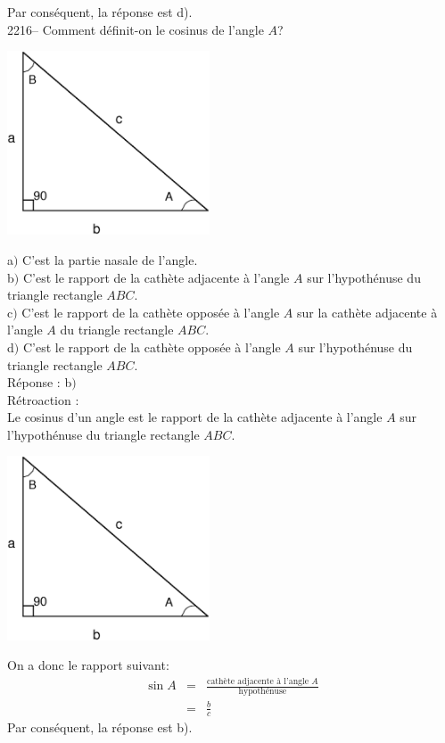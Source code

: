 \documentclass[letterpaper, 12pt]{article}
\begin{document}
Par cons\'equent, la r\'eponse est d).\\

2216-- Comment d\'efinit-on le cosinus de l'angle $A$? \\
\begin{center}
 \includegraphics[width=6cm,bb=14 14 591 533]{Triangle_rectangle2.eps}
\end{center}
a$)$ C'est la partie nasale de l'angle.\\
b$)$ C'est le rapport de la cath\`ete adjacente \`a l'angle $A$ sur l'hypoth\'enuse du triangle rectangle $ABC$.\\
c$)$ C'est le rapport de la cath\`ete oppos\'ee \`a l'angle $A$ sur la cath\`ete adjacente \`a l'angle $A$ du triangle rectangle $ABC$.\\
d$)$ C'est le rapport de la cath\`ete oppos\'ee \`a l'angle $A$ sur l'hypoth\'enuse du triangle rectangle $ABC$.\\

R\'eponse : b$)$\\

R\'etroaction :\\
Le cosinus d'un angle est le rapport de la cath\`ete adjacente \`a l'angle $A$ sur l'hypoth\'enuse du triangle rectangle $ABC$.\\
\begin{center}
 \includegraphics[width=6cm,bb=14 14 591 533]{Triangle_rectangle2.eps}
\end{center}
On a donc le rapport suivant:
\begin{eqnarray*}
 \sin{A} &=&\frac{\textrm{cath\`ete adjacente \`a l'angle $A$}}{\textrm{hypoth\'enuse}}\\
&=& \frac{b}{c}
\end{eqnarray*}
Par cons\'equent, la r\'eponse est b).\\
\end{document}
